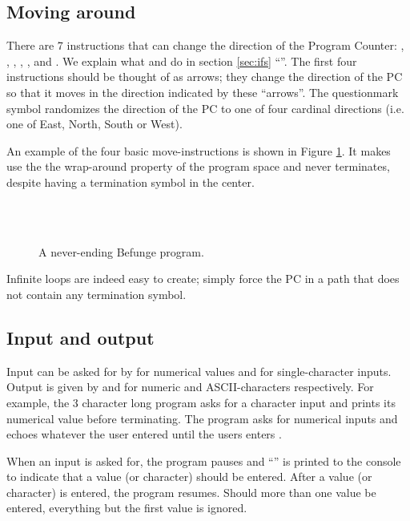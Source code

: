 \documentclass[12pt, a4paper]{article}
\begin{document}
\subsection{Moving around}
\label{sec:movement}

There are 7 instructions that can change the direction of the Program Counter: \code{>}, , \code{<}, \code{\^}, , \code{\_} and \code{|}. We explain what \code{\_} and \code{|} do in section \ref{sec:ifs} “”. The first four instructions should be thought of as arrows; they change the direction of the PC so that it moves in the direction indicated by these “arrows”. The questionmark symbol  randomizes the direction of the PC to one of four cardinal directions (i.e. one of East, North, South or West).

An example of the four basic move-instructions is shown in Figure \ref{fig:basicmove}. It makes use the the wrap-around property of the program space and never terminates, despite having a termination symbol in the center.

\begin{figure}[!ht]
\centering
\code{< \^{}}\\
\\
\caption{A never-ending Befunge program.}
\label{fig:basicmove}
\end{figure}

Infinite loops are indeed easy to create; simply force the PC in a path that does not contain any termination symbol.

\subsection{Input and output}
\label{sec:io}

Input can be asked for by \code{\&} for numerical values and \code{\~} for single-character inputs. Output is given by  and \code{,} for numeric and ASCII-characters respectively. For example, the 3 character long program  asks for a character input and prints its numerical value before terminating. The program  asks for numerical inputs and echoes whatever the user entered until the users enters .

When an input is asked for, the program pauses and “\code{>{}>}” is printed to the console to indicate that a value (or character) should be entered. After a value (or character) is entered, the program resumes. Should more than one value be entered, everything but the first value is ignored.
\end{document}
